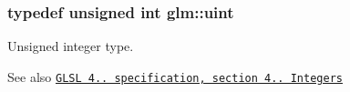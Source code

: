 \subsubsection[{\texorpdfstring{uint}{uint}}]{\setlength{\rightskip}{0pt plus 5cm}typedef unsigned int {\bf glm\+::uint}}\hypertarget{group__core__precision_ga4fd29415871152bfb5abd588334147c8}{}\label{group__core__precision_ga4fd29415871152bfb5abd588334147c8}
Unsigned integer type.

\begin{DoxySeeAlso}{See also}
\href{http://www.opengl.org/registry/doc/GLSLangSpec.4.20.8.pdf}{\tt G\+L\+SL 4.. specification, section 4.. Integers} 
\end{DoxySeeAlso}
